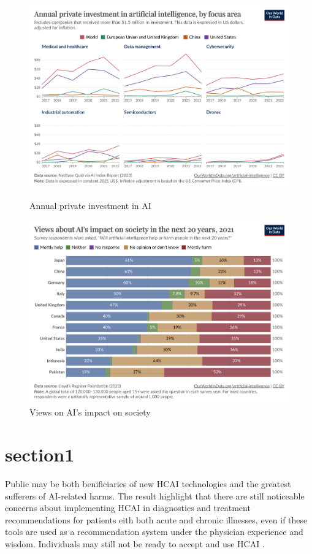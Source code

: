 \documentclass[paper=a4, fontsize=11pt]{scrartcl} %
\numberwithin{equation}{section} %
\numberwithin{figure}{section} %
\numberwithin{table}{section} %
\begin{document}
\begin{figure}[htbp]
    \centering
    \begin{minipage}[t]{0.48\linewidth}
        \includegraphics[width=\linewidth]{./data/investegatement.png}
        \caption{Annual private investment in AI}
        \label{fig:investment}
    \end{minipage}\hfill
    \begin{minipage}[t]{0.48\linewidth}
        \includegraphics[width=\linewidth]{./data/influence.png}
        \caption{Views on AI's impact on society}
        \label{fig:views_ai_impact}
    \end{minipage}
\end{figure}



\section{section1}
Public may be both benificiaries of new HCAI technologies and the greatest sufferers of AI-related harms. The result highlight that there are still noticeable concerns about 
implementing HCAI in diagnostics and treatment recommendations for patients eith both acute and chronic illnesses, even if these tools are used as a recommendation system under the 
physician experience and wisdom. Individuals may still not be ready to accept and use HCAI \cite{esmaeilzadehPatientsPerceptionsHuman2021}.
\end{document}
